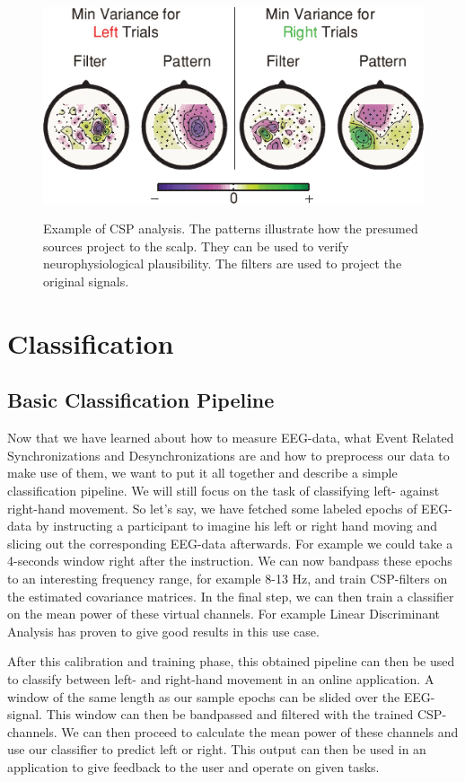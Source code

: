 \documentclass[12pt,twoside,twocolumn]{article}
\begin{document}
\begin{figure}
\includegraphics[scale=0.40]{topos.png} \\
\caption{Example of CSP analysis. The patterns illustrate how the presumed sources project to the scalp. They can be used to verify neurophysiological plausibility. The filters are used to project the original signals.}
\end{figure}

\section{Classification}
\subsection{Basic Classification Pipeline}
Now that we have learned about how to measure EEG-data, what  Event Related Synchronizations and Desynchronizations are and how to preprocess our data to make use of them, we want to put it all together and describe a simple classification pipeline. We will still focus on the task of classifying left- against right-hand movement.
So let's say, we have fetched some labeled epochs of EEG-data by instructing a participant to imagine his left or right hand moving and slicing out the corresponding EEG-data afterwards. For example we could take a 4-seconds window right after the instruction. We can now bandpass these epochs to an interesting frequency range, for example 8-13 Hz, and train CSP-filters on the estimated covariance matrices. In the final step, we can then train a classifier on the mean power of these virtual channels. For example Linear Discriminant Analysis has proven to give good results in this use case.

After this calibration and training phase, this obtained pipeline can then be used to classify between left- and right-hand movement in an online application. A window of the same length as our sample epochs can be slided over the EEG-signal. This window can then be bandpassed and filtered with the trained CSP-channels. We can then proceed to calculate the mean power of these channels and use our classifier to predict left or right. This output can then be used in an application to give feedback to the user and operate on given tasks.
\end{document}
